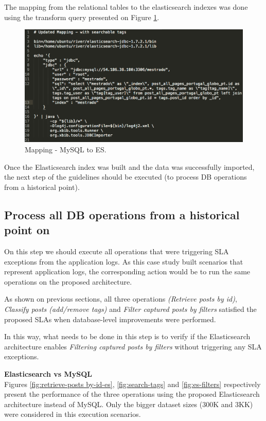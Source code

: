 The mapping from the relational tables to the elasticsearch indexes was done using the transform query presented on Figure \ref{fig:mysql-to-es}.

\begin{figure}[ht!]
	\centering
	\includegraphics[width=120mm]{Imagens/mysqlToES.png}
	\caption{Mapping - MySQL to ES. \label{fig:mysql-to-es}}
\end{figure}

Once the Elasticsearch index was built and the data was successfully imported, the next step of the guidelines should be executed (to process DB operations from a historical point).


\subsection{Process all DB operations from a historical point on}

On this step we should execute all operations that were triggering SLA exceptions from the application logs. As this case study built scenarios that represent application logs, the corresponding action would be to run the same operations on the proposed architecture. 

As shown on previous sections, all three operations \textit{(Retrieve posts by id)}, \textit{Classify posts (add/remove tags)} and \textit{Filter captured posts by filters}
satisfied the proposed SLAs when database-level improvements were performed. 

In this way, what needs to be done in this step is to verify if the Elasticsearch architecture enables \textit{Filtering captured posts by filters} without triggering any SLA exceptions.

\noindent \textbf{Elasticsearch vs MySQL \\}
Figures \ref{fig:retrieve-posts by-id-es}, \ref{fig:search-tags} and \ref{fig:es-filters} respectively present the performance of the three operations using the proposed Elasticsearch architecture instead of MySQL. Only the bigger dataset sizes (300K and 3KK) were considered in this execution scenarios.

